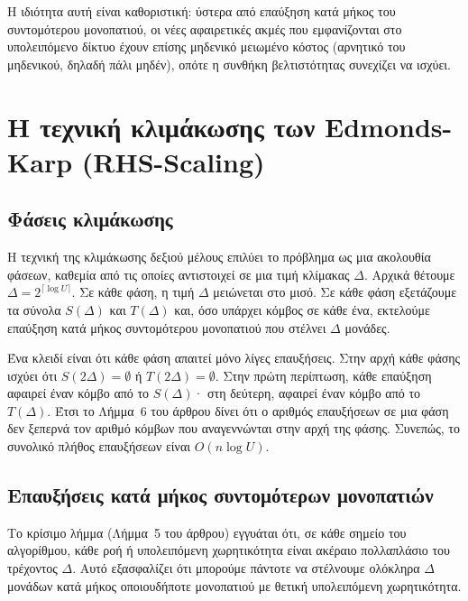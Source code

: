 \documentclass[11pt,a4paper,oneside]{report}
\let\oldsubsection\subsection
\renewcommand{\subsection}{\FloatBarrier\oldsubsection}
\begin{document}
Η ιδιότητα αυτή είναι καθοριστική: ύστερα από επαύξηση κατά μήκος του συντομότερου μονοπατιού, οι νέες αφαιρετικές ακμές που εμφανίζονται στο υπολειπόμενο δίκτυο έχουν επίσης μηδενικό μειωμένο κόστος (αρνητικό του μηδενικού, δηλαδή πάλι μηδέν), οπότε η συνθήκη βελτιστότητας συνεχίζει να ισχύει.

\section{Η τεχνική κλιμάκωσης των \textenglish{Edmonds-Karp} (\textenglish{RHS-Scaling})}

\subsection{Φάσεις κλιμάκωσης}

Η τεχνική της κλιμάκωσης δεξιού μέλους επιλύει το πρόβλημα ως μια ακολουθία φάσεων, καθεμία από τις οποίες αντιστοιχεί σε μια τιμή κλίμακας $\Delta$. Αρχικά θέτουμε $\Delta = 2^{\lceil \log U \rceil}$. Σε κάθε φάση, η τιμή $\Delta$ μειώνεται στο μισό. Σε κάθε φάση εξετάζουμε τα σύνολα $S(\Delta)$ και $T(\Delta)$ και, όσο υπάρχει κόμβος σε κάθε ένα, εκτελούμε επαύξηση κατά μήκος συντομότερου μονοπατιού που στέλνει $\Delta$ μονάδες.

Ένα κλειδί είναι ότι κάθε φάση απαιτεί μόνο λίγες επαυξήσεις. Στην αρχή κάθε φάσης ισχύει ότι $S(2\Delta) = \emptyset$ ή $T(2\Delta) = \emptyset$. Στην πρώτη περίπτωση, κάθε επαύξηση αφαιρεί έναν κόμβο από το $S(\Delta)$· στη δεύτερη, αφαιρεί έναν κόμβο από το $T(\Delta)$. Έτσι το Λήμμα~6 του άρθρου δίνει ότι ο αριθμός επαυξήσεων σε μια φάση δεν ξεπερνά τον αριθμό κόμβων που αναγεννώνται στην αρχή της φάσης. Συνεπώς, το συνολικό πλήθος επαυξήσεων είναι $O(n \log U)$.

\subsection{Επαυξήσεις κατά μήκος συντομότερων μονοπατιών}

Το κρίσιμο λήμμα (Λήμμα~5 του άρθρου) εγγυάται ότι, σε κάθε σημείο του αλγορίθμου, κάθε ροή ή υπολειπόμενη χωρητικότητα είναι ακέραιο πολλαπλάσιο του τρέχοντος $\Delta$. Αυτό εξασφαλίζει ότι μπορούμε πάντοτε να στέλνουμε ολόκληρα $\Delta$ μονάδων κατά μήκος οποιουδήποτε μονοπατιού με θετική υπολειπόμενη χωρητικότητα.
\end{document}
